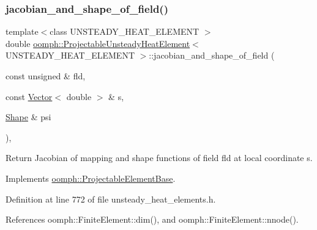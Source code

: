 \mbox{\label{classoomph_1_1ProjectableUnsteadyHeatElement_a49318b95add2b1ac8c6f0f0cfac195f6}} 
\subsubsection{\texorpdfstring{jacobian\+\_\+and\+\_\+shape\+\_\+of\+\_\+field()}{jacobian\_and\_shape\_of\_field()}}
{\footnotesize\ttfamily template$<$class U\+N\+S\+T\+E\+A\+D\+Y\+\_\+\+H\+E\+A\+T\+\_\+\+E\+L\+E\+M\+E\+NT $>$ \\
double \hyperlink{classoomph_1_1ProjectableUnsteadyHeatElement}{oomph\+::\+Projectable\+Unsteady\+Heat\+Element}$<$ U\+N\+S\+T\+E\+A\+D\+Y\+\_\+\+H\+E\+A\+T\+\_\+\+E\+L\+E\+M\+E\+NT $>$\+::jacobian\+\_\+and\+\_\+shape\+\_\+of\+\_\+field (\begin{DoxyParamCaption}\item[{const unsigned \&}]{fld,  }\item[{const \hyperlink{classoomph_1_1Vector}{Vector}$<$ double $>$ \&}]{s,  }\item[{\hyperlink{classoomph_1_1Shape}{Shape} \&}]{psi }\end{DoxyParamCaption})\hspace{0.3cm}{\ttfamily [inline]}, {\ttfamily [virtual]}}



Return Jacobian of mapping and shape functions of field fld at local coordinate s. 



Implements \hyperlink{classoomph_1_1ProjectableElementBase_ad45c21b58c0985d52f68ab2d79cbb488}{oomph\+::\+Projectable\+Element\+Base}.



Definition at line 772 of file unsteady\+\_\+heat\+\_\+elements.\+h.



References oomph\+::\+Finite\+Element\+::dim(), and oomph\+::\+Finite\+Element\+::nnode().

\mbox{\label{classoomph_1_1ProjectableUnsteadyHeatElement_ad3c589c0bd97ac402919e426e5ee0e6b}} 
